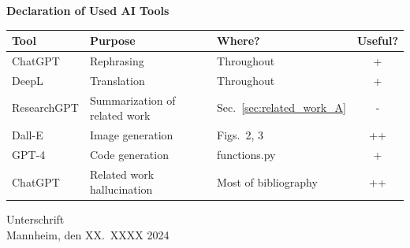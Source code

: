 \documentclass[a4paper,oneside,bibliography=totoc]{scrbook}
\begin{document}
\begin{center}
  \textbf{Declaration of Used AI Tools} \\[.3em]
  \begin{tabularx}{\textwidth}{lXlc}
    \toprule
    Tool & Purpose & Where? & Useful? \\
    \midrule
    ChatGPT & Rephrasing & Throughout & + \\
    DeepL & Translation & Throughout & + \\
    ResearchGPT & Summarization of related work & Sec.~\ref{sec:related_work_A} & - \\
    Dall-E & Image generation & Figs.~2, 3 & ++ \\
    GPT-4 & Code generation & functions.py & + \\
    ChatGPT & Related work hallucination & Most of bibliography & ++ \\
    \bottomrule
  \end{tabularx}
\end{center}

\vspace{2cm}
\noindent Unterschrift\\
\noindent Mannheim, den XX.~XXXX 2024 \hfill
\end{document}

